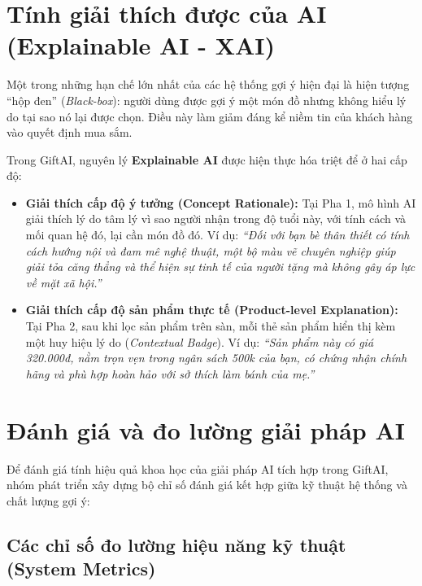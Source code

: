 \section{Tính giải thích được của AI (Explainable AI - XAI)}

Một trong những hạn chế lớn nhất của các hệ thống gợi ý hiện đại là hiện tượng ``hộp đen'' (\textit{Black-box}): người dùng được gợi ý một món đồ nhưng không hiểu lý do tại sao nó lại được chọn. Điều này làm giảm đáng kể niềm tin của khách hàng vào quyết định mua sắm.

Trong GiftAI, nguyên lý \textbf{Explainable AI} được hiện thực hóa triệt để ở hai cấp độ:
\begin{itemize}
    \item \textbf{Giải thích cấp độ ý tưởng (Concept Rationale):} Tại Pha 1, mô hình AI giải thích lý do tâm lý vì sao người nhận trong độ tuổi này, với tính cách và mối quan hệ đó, lại cần món đồ đó. Ví dụ: \textit{``Đối với bạn bè thân thiết có tính cách hướng nội và đam mê nghệ thuật, một bộ màu vẽ chuyên nghiệp giúp giải tỏa căng thẳng và thể hiện sự tinh tế của người tặng mà không gây áp lực về mặt xã hội.''}
    \item \textbf{Giải thích cấp độ sản phẩm thực tế (Product-level Explanation):} Tại Pha 2, sau khi lọc sản phẩm trên sàn, mỗi thẻ sản phẩm hiển thị kèm một huy hiệu lý do (\textit{Contextual Badge}). Ví dụ: \textit{``Sản phẩm này có giá 320.000đ, nằm trọn vẹn trong ngân sách 500k của bạn, có chứng nhận chính hãng và phù hợp hoàn hảo với sở thích làm bánh của mẹ.''}
\end{itemize}

\section{Đánh giá và đo lường giải pháp AI}

Để đánh giá tính hiệu quả khoa học của giải pháp AI tích hợp trong GiftAI, nhóm phát triển xây dựng bộ chỉ số đánh giá kết hợp giữa kỹ thuật hệ thống và chất lượng gợi ý:

\subsection{Các chỉ số đo lường hiệu năng kỹ thuật (System Metrics)}

